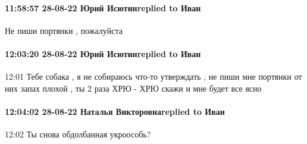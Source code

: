  
 
 
 
 


\paragraph{11:58:57 28-08-22 Юрий Исютинreplied to Иван}
Не пиши портянки , пожалуйста

\paragraph{12:03:20 28-08-22 Юрий Исютинreplied to Иван}
12:01
Тебе собака , я не собираюсь что-то утверждать , не пиши мне портянки от них запах плохой , ты 2 раза ХРЮ - ХРЮ скажи и мне будет все ясно

\paragraph{12:04:02 28-08-22 Наталья Викторовнаreplied to Иван}
12:02
Ты снова обдолбанная укроособь?
